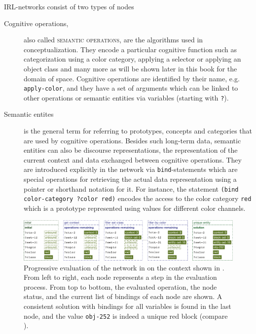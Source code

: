 IRL-networks consist of two types of nodes 
\begin{description}
\item[Cognitive operations,] also called \textsc{semantic operations},
are the algorithms used in conceptualization. They encode a particular cognitive 
function such as categorization using a color category,
applying a selector or applying an object class and many more as will be shown
later in this book for the domain of space. Cognitive operations 
are identified by their name, e.g. {\footnotesize\tt apply-color}, and
they have a set of arguments which can be linked to other operations
or semantic entities via variables (starting with {\footnotesize\tt ?}).
\item[Semantic entites] is the general term for referring to prototypes,
concepts and categories that are used by cognitive operations.
Besides such long-term data, semantic entities can also be
discourse representations, the representation of the current context
and data exchanged between cognitive operations. They
are introduced explicitly in the network via {\footnotesize\tt bind}-statements
which are special operations for retrieving the actual data representation
using a pointer or shorthand notation for it. For instance, 
the statement {\footnotesize\tt (bind color-category ?color red)}
encodes the access to the color category {\footnotesize\tt red} which
is a prototype represented using values for different color channels.
\end{description}


\begin{figure}
\center
\includegraphics[width=\textwidth]{figs/evaluation-tree}
\caption[Evaluation of an IRL-network]{Progressive evaluation 
of the network in 
on the context shown in .
From left to right, each node represents a step in the evaluation process. From top to bottom, the evaluated operation, the node status, and the current list of bindings of each node are shown. A consistent solution with bindings for all variables is found in the last node, and the value 
{\footnotesize\tt obj-252} is indeed a unique red block (compare ).}
\label{f:evaluation-tree}
\end{figure}

